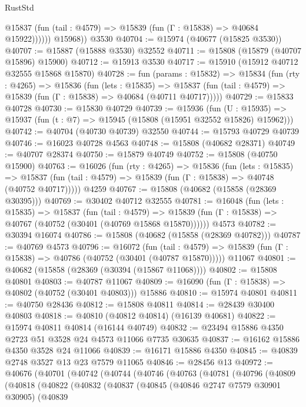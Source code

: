 \begin{lexlean}{RustStd}
\begin{coremodule}
              @15837 (fun (tail : @4579) => @15839 (fun (Γ : @15838) => @40684 @15922))))))
        @15968))
    @3530
@40704 := @15974 (@40677 (@15825 @3530))
@40707 := @15887 (@15888 @3530) @32552
@40711 := @15808 (@15879 (@40707 @15896) @15900)
@40712 := @15913 @3530
@40717 := @15910 (@15912 @40712 @32555 @15868 @15870)
@40728 := fun (params : @15832) =>
  @15834
    (fun (rty : @4265) =>
    @15836
      (fun (lets : @15835) =>
      @15837 (fun (tail : @4579) => @15839 (fun (Γ : @15838) => @40684 (@40711 @40717)))))
@40729 := @15833 @40728
@40730 := @15830 @40729
@40739 := @15936
    (fun (U : @15935) => @15937 (fun (t : @7) => @15945 (@15808 (@15951 @32552 @15826) @15962)))
@40742 := @40704 (@40730 @40739) @32550
@40744 := @15793 @40729 @40739
@40746 := @16023 @40728 @4563
@40748 := @15808 (@40682 @28371)
@40749 := @40707 @28374
@40750 := @15879 @40749
@40752 := @15808 (@40750 @15900)
@40763 := @16026
    (fun (rty : @4265) =>
    @15836
      (fun (lets : @15835) =>
      @15837 (fun (tail : @4579) => @15839 (fun (Γ : @15838) => @40748 (@40752 @40717)))))
    @4259
@40767 := @15808 (@40682 (@15858 (@28369 @30395)))
@40769 := @30402 @40712 @32555
@40781 := @16048
    (fun (lets : @15835) =>
    @15837
      (fun (tail : @4579) =>
      @15839 (fun (Γ : @15838) => @40767 (@40752 (@30401 (@40769 @15868 @15870))))))
    @4573
@40782 := @30394 @16074
@40786 := @15808 (@40682 (@15858 (@28369 @40782)))
@40787 := @40769 @4573
@40796 := @16072
    (fun (tail : @4579) => @15839 (fun (Γ : @15838) => @40786 (@40752 (@30401 (@40787 @15870)))))
    @11067
@40801 := @40682 (@15858 (@28369 (@30394 (@15867 @11068))))
@40802 := @15808 @40801
@40803 := @40787 @11067
@40809 := @16090 (fun (Γ : @15838) => @40802 (@40752 (@30401 @40803))) @15886
@40810 := @15974 @40801
@40811 := @40750 @28436
@40812 := @15808 @40811
@40814 := @28439 @30400 @40803
@40818 := @40810 (@40812 @40814) (@16139 @40681)
@40822 := @15974 @40811 @40814 (@16144 @40749)
@40832 := @23494 @15886 @4350 @2723 @51 @3528 @24 @4573 @11066 @7735 @30635
@40837 := @16162 @15886 @4350 @3528 @24 @11066
@40839 := @16171 @15886 @4350
@40845 := @40839 @2748 @3527 @13 @23 @7579 @11065
@40846 := @28456 @13
@40972 := @40676
    (@40701
      (@40742
        (@40744
          (@40746
            (@40763
              (@40781
                (@40796
                  (@40809
                    (@40818
                      (@40822
                        (@40832
                          (@40837
                            (@40845
                              (@40846 @2747 @7579 @30901 @30905)
                              (@40839

\end{coremodule}
\end{lexlean}
